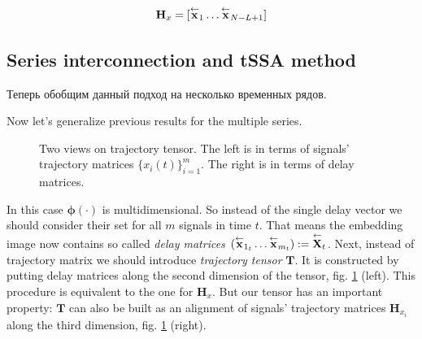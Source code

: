 	\[
		\mathbf{H}_x = [ \overset{\leftarrow}{\mathbf{x}}_{1} \ldots  \overset{\leftarrow}{\mathbf{x}}_{N - L + 1}]
	\]
	
	\subsection*{Series interconnection and tSSA method}\label{sec:tssa_method}
	
	Теперь обобщим данный подход на несколько временных рядов.
	
	Now let's generalize previous results for the multiple series.
	
	\begin{figure}[h]
		\centering
		
		\caption{Two views on trajectory tensor. The left is in terms of signals' trajectory matrices $ \{x_i(t)\}_{i=1}^m $. The right is in terms of delay matrices.}\label{pic:traj_tensor}
	\end{figure}
	
	In this case $ \boldsymbol{\phi}(\cdot) $ is multidimensional. So instead of the single delay vector we should consider their set for all $ m $ signals in time $ t $. That means the embedding image now contains so called \emph{delay matrices} $ ( \overset{\leftarrow}{\mathbf{x}}_{1_t} \ldots \overset{\leftarrow}{\mathbf{x}}_{m_t} ) := \overset{\leftarrow}{\mathbf{X}}_{t} $. Next, instead of trajectory matrix we should introduce \textit{trajectory tensor} $ \mathbf{T} $. It is constructed  by putting delay matrices along the second dimension of the tensor, fig. \ref{pic:traj_tensor} (left). This procedure is equivalent to the one for $ \mathbf{H}_x $. But our tensor has an important property: $ \mathbf{T} $ can also be built as an alignment of signals' trajectory matrices $ \mathbf{H}_{x_i} $ along the third dimension, fig. \ref{pic:traj_tensor} (right).
	
